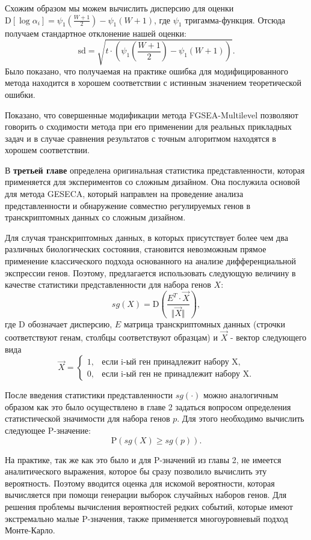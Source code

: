 Схожим образом мы можем вычислить дисперсию для оценки $\mathrm{D} \left[\log \alpha_i \right]= \psi_1 \left(\frac{W + 1}{2}\right) - \psi_1 \left( W + 1 \right)$, где $\psi_1$ тригамма-функция. Отсюда получаем стандартное отклонение нашей оценки:
\[
    \mathrm{sd} = \sqrt{t \cdot \left( \psi_1 \left(\frac{W+1}{2}\right) - \psi_1 \left(W + 1\right)\right)}.    
\]
Было показано, что получаемая на практике ошибка для модифицированного метода находится в хорошем соответствии с истинным значением теоретической ошибки.  

Показано, что совершенные модификации метода FGSEA-Multilevel позволяют говорить о сходимости метода при его применении для реальных прикладных задач и в случае сравнения результатов с точным алгоритмом находятся в хорошем соответствии.


В \textbf{третьей главе} определена оригинальная статистика представленности, которая применяется для экспериментов со сложным дизайном.
Она послужила основой для метода GESECA, который направлен на проведение анализа представленности и обнаружение совместно регулируемых генов в транскриптомных данных со сложным дизайном.

Для случая транскриптомных данных, в которых присутствует более чем два различных биологических состояния, становится невозможным прямое применение классического подхода основанного на анализе дифференциальной экспрессии генов.
Поэтому, предлагается использовать следующую величину в качестве статистики представленности для набора генов $X$:
\[
       sg(X) = \mathrm{D} \left(\frac{E^T \cdot \overrightarrow{X}}{\Vert \overrightarrow{X} \Vert}\right),
\]
где $\mathrm{D}$ обозначает дисперсию, $E$ матрица транскриптомных данных (строчки соответствуют генам, столбцы соответствуют образцам) и $\overrightarrow{X}$ - вектор следующего вида
\[
    \overrightarrow{X} = \begin{cases}
        1, & \text{если i-ый ген принадлежит набору X}, \\
        0, & \text{если i-ый ген не принадлежит набору X}.
    \end{cases}
\]

После введения статистики представленности $sg(\cdot)$ можно аналогичным образом как это было осуществлено в главе 2 задаться вопросом определения статистической значимости для набора генов $p$.
Для этого необходимо вычислить следующее P-значение:
\[
    \mathrm{P} \left( sg(X) \geqslant sg(p) \right). 
\] 

На практике, так же как это было и для P-значений из главы 2, не имеется аналитического выражения, которое бы сразу позволило вычислить эту вероятность.
Поэтому вводится оценка для искомой вероятности, которая вычисляется при помощи генерации выборок случайных наборов генов.
Для решения проблемы вычисления вероятностей редких событий, которые имеют экстремально малые P-значения, также применяется многоуровневый подход Монте-Карло.


